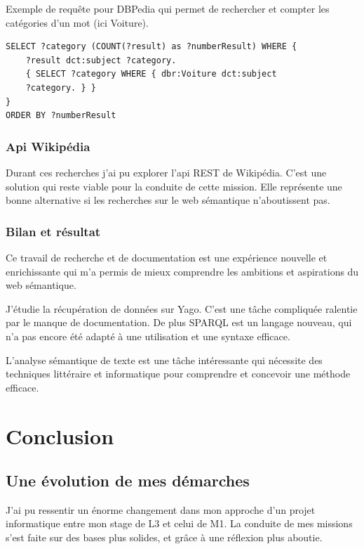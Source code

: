 \documentclass[french]{article}
\begin{document}
{Exemple de requête pour DBPedia qui permet de rechercher et compter les catégories d'un mot (ici Voiture).

\begin{lstlisting}[language=SPARQL, backgroundcolor=\color{lightgray}]
SELECT ?category (COUNT(?result) as ?numberResult) WHERE {
    ?result dct:subject ?category.
    { SELECT ?category WHERE { dbr:Voiture dct:subject 
    ?category. } }
}
ORDER BY ?numberResult
\end{lstlisting}
\subsubsection{Api Wikipédia}

Durant ces recherches j'ai pu explorer l'api REST de Wikipédia. C'est une solution qui reste viable pour la conduite de cette mission. Elle représente une bonne alternative si les recherches sur le web sémantique n'aboutissent pas.

\subsubsection{Bilan et résultat}

Ce travail de recherche et de documentation est une expérience nouvelle et enrichissante qui m'a permis de mieux comprendre les ambitions et aspirations du web sémantique.

J'étudie la récupération de données sur Yago. C'est une tâche compliquée ralentie par le manque de documentation. De plus SPARQL est un langage nouveau, qui n'a pas encore été adapté à une utilisation et une syntaxe efficace.

L'analyse sémantique de texte est une tâche intéressante qui nécessite des techniques littéraire et informatique pour comprendre et concevoir une méthode efficace.

\section{Conclusion}

\subsection{Une évolution de mes démarches}

J'ai pu ressentir un énorme changement dans mon approche d'un projet informatique entre mon stage de L3 et celui de M1. La conduite de mes missions s'est faite sur des bases plus solides, et grâce à une réflexion plus aboutie.

}
\end{document}
